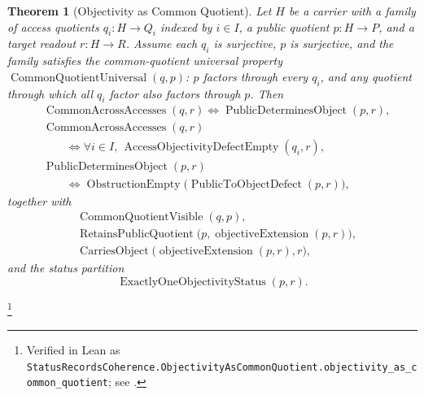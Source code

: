 \documentclass[11pt]{article}
\newtheorem{theorem}{Theorem}[section]
\theoremstyle{definition}
\begin{document}
\begin{theorem}[Objectivity as Common Quotient]\label{thm:F17}
Let \(H\) be a carrier with a family of access quotients
\(q_i:H\to Q_i\) indexed by \(i\in I\), a public quotient
\(p:H\to P\), and a target readout \(r:H\to R\).  Assume each
\(q_i\) is surjective, \(p\) is surjective, and the family satisfies
the common-quotient universal property
\(\operatorname{CommonQuotientUniversal}(q,p)\): \(p\) factors
through every \(q_i\), and any quotient through which all \(q_i\)
factor also factors through \(p\).  Then
\begin{align*}
  &\operatorname{CommonAcrossAccesses}(q,r)
    \iff \operatorname{PublicDeterminesObject}(p,r),\\
  &\operatorname{CommonAcrossAccesses}(q,r)\\
  &\qquad{}\iff
    \forall i\in I,\,
      \operatorname{AccessObjectivityDefectEmpty}(q_i,r),\\
  &\operatorname{PublicDeterminesObject}(p,r)\\
  &\qquad{}\iff
    \operatorname{ObstructionEmpty}
      \bigl(\operatorname{PublicToObjectDefect}(p,r)\bigr),
\end{align*}
together with
\begin{align*}
  &\operatorname{CommonQuotientVisible}(q,p),\\
  &\operatorname{RetainsPublicQuotient}
      \bigl(p,\operatorname{objectiveExtension}(p,r)\bigr),\\
  &\operatorname{CarriesObject}
      \bigl(\operatorname{objectiveExtension}(p,r),r\bigr),
\end{align*}
and the status partition
\[
  \operatorname{ExactlyOneObjectivityStatus}(p,r).
\]
\end{theorem}
\footnote{\raggedright Verified in Lean as
\texttt{StatusRecordsCoherence.\allowbreak{}ObjectivityAsCommonQuotient.\allowbreak{}objectivity\_as\_common\_quotient};
see .}
\end{document}
